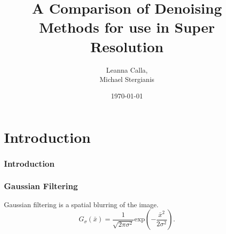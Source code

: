 \documentclass{beamer}
\title{A Comparison of Denoising Methods for use in Super Resolution}
\author{Leanna Calla,\\Michael Stergianis}
\institute{University of Ontario Institute of Technology}
\date{\today}
\begin{document}
\frame{\titlepage}
\section{Introduction}
\begin{frame}
  \frametitle{Introduction}
\end{frame}
\begin{frame}
  \frametitle{Gaussian Filtering}
  Gaussian filtering is a spatial blurring of the image.
  \[G_{\sigma}(\bar{x}) = \frac{1}{\sqrt{2 \pi \sigma^2}} \text{exp} \left(-
      \frac{\bar{x}^2}{2 \sigma^2}\right). \]
\end{frame}
\end{document}
